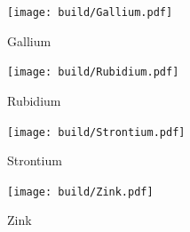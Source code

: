 \begin{figure}[H]
  \centering
  \texttt{[image: build/Gallium.pdf]}
  \caption{Gallium}
  \label{fig:Gallium}
\end{figure}

\begin{figure}[H]
  \centering
  \texttt{[image: build/Rubidium.pdf]}
  \caption{Rubidium}
  \label{fig:Rubidium}
\end{figure}

\begin{figure}[H]
  \centering
  \texttt{[image: build/Strontium.pdf]}
  \caption{Strontium}
  \label{fig:Strontium}
\end{figure}

\begin{figure}[H]
  \centering
  \texttt{[image: build/Zink.pdf]}
  \caption{Zink}
  \label{fig:Zink}
\end{figure}